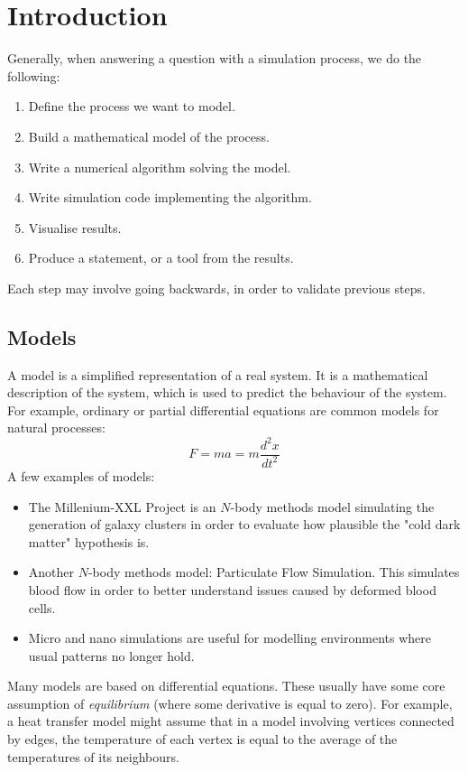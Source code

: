 \documentclass[twocolumn]{article}
\begin{document}
    \pagestyle{fancy}
    \fancyfoot[C]{}
    \setcounter{section}{0}
    \section{Introduction}
    Generally, when answering a question with a simulation process, we do the following:
    \begin{enumerate}
        \item Define the process we want to model.
        \item Build a mathematical model of the process.
        \item Write a numerical algorithm solving the model.
        \item Write simulation code implementing the algorithm.
        \item Visualise results.
        \item Produce a statement, or a tool from the results.
    \end{enumerate}
    Each step may involve going backwards, in order to validate previous steps.
    \subsection{Models}
    A model is a simplified representation of a real system. It is a mathematical description of the system, which is used to predict the behaviour of the system. For example, ordinary or partial differential equations are common models for natural processes:
    \[F = ma = m \frac{d^2x}{dt^2}\]
    A few examples of models:
    \begin{itemize}
        \item The Millenium-XXL Project is an $N$-body methods model simulating the generation of galaxy clusters in order to evaluate how plausible the "cold dark matter" hypothesis is.
        \item Another $N$-body methods model: Particulate Flow Simulation. This simulates blood flow in order to better understand issues caused by deformed blood cells.
        \item Micro and nano simulations are useful for modelling environments where usual patterns no longer hold.
    \end{itemize}
    Many models are based on differential equations. These usually have some core assumption of \emph{equilibrium} (where some derivative is equal to zero). For example, a heat transfer model might assume that in a model involving vertices connected by edges, the temperature of each vertex is equal to the average of the temperatures of its neighbours.
\end{document}
